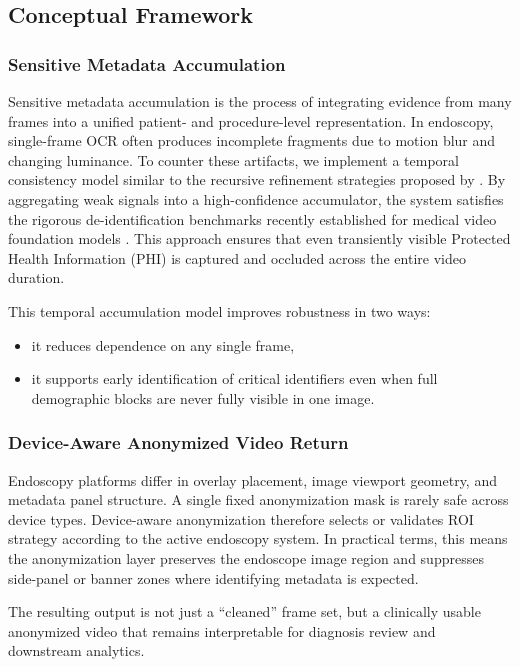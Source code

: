 \documentclass{article}
\begin{document}
\subsection{Conceptual Framework}
\subsubsection{Sensitive Metadata Accumulation}
Sensitive metadata accumulation is the process of integrating evidence from many
frames into a unified patient- and procedure-level representation. In endoscopy,
single-frame OCR often produces incomplete fragments due to motion blur and
changing luminance. To counter these artifacts, we implement a temporal 
consistency model similar to the recursive refinement strategies proposed by 
\cite{klein2023temporal}. By aggregating weak signals into a high-confidence 
accumulator, the system satisfies the rigorous de-identification benchmarks 
recently established for medical video foundation models \cite{zhao2024foundation}.
This approach ensures that even transiently visible Protected Health Information 
(PHI) is captured and occluded across the entire video duration.

This temporal accumulation model improves robustness in two ways:
\begin{itemize}
  \item it reduces dependence on any single frame,
  \item it supports early identification of critical identifiers even when full
  demographic blocks are never fully visible in one image.
\end{itemize}

\subsubsection{Device-Aware Anonymized Video Return}
Endoscopy platforms differ in overlay placement, image viewport geometry, and
metadata panel structure. A single fixed anonymization mask is rarely safe
across device types. Device-aware anonymization therefore selects or validates
ROI strategy according to the active endoscopy system. In practical terms, this
means the anonymization layer preserves the endoscope image region and suppresses
side-panel or banner zones where identifying metadata is expected.

The resulting output is not just a ``cleaned'' frame set, but a clinically
usable anonymized video that remains interpretable for diagnosis review and
downstream analytics.
\end{document}
